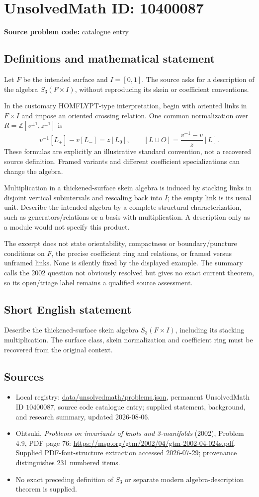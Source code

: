 \documentclass[11pt]{article}
\begin{document}
\section*{UnsolvedMath ID: 10400087}
\textbf{Source problem code:} catalogue entry
\subsection{Definitions and mathematical statement}
Let \(F\) be the intended surface and \(I=[0,1]\). The source asks for a description of the algebra \(S_3(F\times I)\), without reproducing its skein or coefficient conventions.

In the customary HOMFLYPT-type interpretation, begin with oriented links in \(F\times I\) and impose an oriented crossing relation. One common normalization over \(R=\mathbb Z[v^{\pm1},z^{\pm1}]\) is
\[
 v^{-1}[L_+]-v[L_-]=z[L_0],\qquad
 [L\sqcup O]=\frac{v^{-1}-v}{z}[L].
\]
These formulas are explicitly an illustrative standard convention, not a recovered source definition. Framed variants and different coefficient specializations can change the algebra.

Multiplication in a thickened-surface skein algebra is induced by stacking links in disjoint vertical subintervals and rescaling back into \(I\); the empty link is its usual unit. Describe the intended algebra by a complete structural characterization, such as generators/relations or a basis with multiplication. A description only as a module would not specify this product.

The excerpt does not state orientability, compactness or boundary/puncture conditions on \(F\), the precise coefficient ring and relations, or framed versus unframed links. None is silently fixed by the displayed example. The summary calls the 2002 question not obviously resolved but gives no exact current theorem, so its open/triage label remains a qualified source assessment.
\subsection{Short English statement}
Describe the thickened-surface skein algebra \(S_3(F\times I)\), including its stacking multiplication. The surface class, skein normalization and coefficient ring must be recovered from the original context.
\subsection{Sources}
\begin{itemize}
\item Local registry: \url{data/unsolvedmath/problems.json}, permanent UnsolvedMath ID \(10400087\), source code catalogue entry; supplied statement, background, and research summary, updated 2026-08-06.
\item Ohtsuki, \emph{Problems on invariants of knots and 3-manifolds} (2002), Problem 4.9, PDF page 76: \url{https://msp.org/gtm/2002/04/gtm-2002-04-024s.pdf}. Supplied PDF-font-structure extraction accessed 2026-07-29; provenance distinguishes 231 numbered items.
\item No exact preceding definition of \(S_3\) or separate modern algebra-description theorem is supplied.
\end{itemize}
\end{document}
